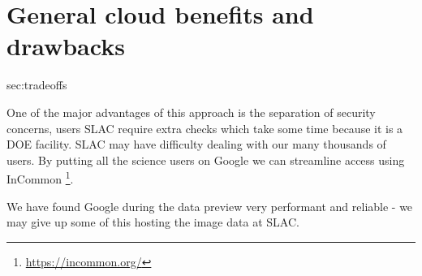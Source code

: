 \section{General cloud benefits and drawbacks}{sec:tradeoffs}

One of the major advantages of this approach is the separation of security concerns, users  SLAC require extra checks which take some time because it is a DOE facility.
SLAC may have difficulty dealing with our many thousands of users.
By putting all the science users on Google we can streamline access using InCommon \footnote{\url{https://incommon.org/}}.

We have found Google during the data preview very performant and reliable - we may give up some of this hosting the image data at SLAC.

